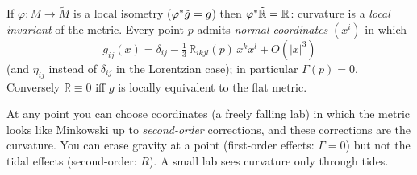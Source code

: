 \begin{formal}
If $\varphi:M\to\tilde M$ is a local isometry ($\varphi{}^{*}\tilde g=g$) then $\varphi{}^{*}\tilde{\mathbb R}=\mathbb R$: curvature is a \emph{local invariant} of the metric. Every point $p$ admits \emph{normal coordinates} $(x^i)$ in which
\[
g_{ij}(x)=\delta_{ij}-\tfrac13\,\mathbb R_{ikjl}(p)\,x^kx^l+O(|x|^3)
\]
(and $\eta_{ij}$ instead of $\delta_{ij}$ in the Lorentzian case); in particular $\Gamma(p)=0$. Conversely $\mathbb R\equiv0$ iff $g$ is locally equivalent to the flat metric.
\end{formal}
\begin{intuition}
At any point you can choose coordinates (a freely falling lab) in which the metric looks like Minkowski up to \emph{second-order} corrections, and these corrections are the curvature. You can erase gravity at a point (first-order effects: $\Gamma=0$) but not the tidal effects (second-order: $R$). A small lab sees curvature only through tides.
\end{intuition}
